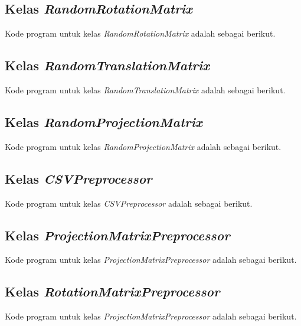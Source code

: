 \subsection{Kelas \textit{RandomRotationMatrix}}
\label{subsec:c-rotation-matrix}
Kode program untuk kelas \textit{RandomRotationMatrix} adalah sebagai berikut.


\subsection{Kelas \textit{RandomTranslationMatrix}}
\label{subsec:c-translation-matrix}
Kode program untuk kelas \textit{RandomTranslationMatrix} adalah sebagai berikut.


\subsection{Kelas \textit{RandomProjectionMatrix}}
\label{subsec:c-projection-matrix}
Kode program untuk kelas \textit{RandomProjectionMatrix} adalah sebagai berikut.



\subsection{Kelas \textit{CSVPreprocessor}}
\label{subsec:c-csv-pre}
Kode program untuk kelas \textit{CSVPreprocessor} adalah sebagai berikut.


\subsection{Kelas \textit{ProjectionMatrixPreprocessor}}
\label{subsec:c-projection-pre}
Kode program untuk kelas \textit{ProjectionMatrixPreprocessor} adalah sebagai berikut.


\subsection{Kelas \textit{RotationMatrixPreprocessor}}
\label{subsec:c-rotation-pre}
Kode program untuk kelas \textit{ProjectionMatrixPreprocessor} adalah sebagai berikut.


